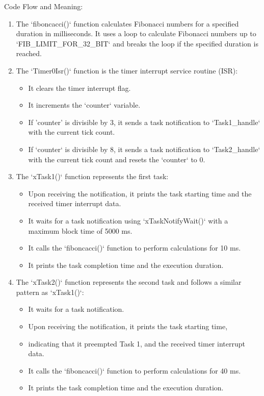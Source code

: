 \documentclass[a4paper,11pt]{article}%
\newenvironment{qanda}{\setlength{\parindent}{0pt}}{\bigskip}
\begin{document}
\begin{qanda}
	Code Flow and Meaning:
\begin{enumerate}
	\item The `fiboncacci()` function calculates Fibonacci numbers for a specified duration in milliseconds. It uses a loop to calculate Fibonacci numbers up to `FIB\_LIMIT\_FOR\_32\_BIT` and breaks the loop if the specified duration is reached.
	\item The `Timer0Isr()` function is the timer interrupt service routine (ISR):
	\begin{itemize}
		\item It clears the timer interrupt flag.
		\item It increments the `counter` variable.
		\item If 'counter' is divisible by 3, it sends a task notification to `Task1\_handle` with the current tick count.
		\item If `counter` is divisible by 8, it sends a task notification to `Task2\_handle` with the current tick count and resets the `counter` to 0.
	\end{itemize}
	\item The `xTask1()` function represents the first task:
	\begin{itemize}
		\item Upon receiving the notification, it prints the task starting time and the received timer interrupt data.
		\item It waits for a task notification using `xTaskNotifyWait()` with a maximum block time of 5000 ms.
		\item It calls the `fiboncacci()` function to perform calculations for 10 ms.
		\item It prints the task completion time and the execution duration.
	\end{itemize}
	\item The `xTask2()` function represents the second task and follows a similar pattern as `xTask1()`:
	\begin{itemize}
		\item It waits for a task notification.
		\item Upon receiving the notification, it prints the task starting time, 
		\item indicating that it preempted Task 1, and the received timer interrupt data.
		\item It calls the `fiboncacci()` function to perform calculations for 40 ms.
		\item It prints the task completion time and the execution duration.

\end{itemize}
\end{enumerate}
\end{qanda}
\end{document}
